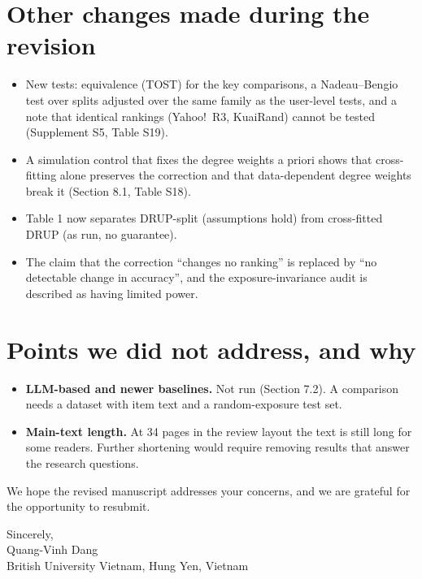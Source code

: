\documentclass[11pt]{article}
\begin{document}
\section*{Other changes made during the revision}
\begin{itemize}[leftmargin=*]
\item New tests: equivalence (TOST) for the key comparisons, a Nadeau--Bengio test over splits adjusted over the same family as the user-level tests, and a note that identical rankings (Yahoo!\ R3, KuaiRand) cannot be tested (Supplement S5, Table S19).
\item A simulation control that fixes the degree weights a priori shows that cross-fitting alone preserves the correction and that data-dependent degree weights break it (Section 8.1, Table S18).
\item Table 1 now separates DRUP-split (assumptions hold) from cross-fitted DRUP (as run, no guarantee).
\item The claim that the correction ``changes no ranking'' is replaced by ``no detectable change in accuracy'', and the exposure-invariance audit is described as having limited power.
\end{itemize}

\section*{Points we did not address, and why}
\begin{itemize}[leftmargin=*]
\item \textbf{LLM-based and newer baselines.} Not run (Section 7.2). A comparison needs a dataset with item text and a random-exposure test set.
\item \textbf{Main-text length.} At 34 pages in the review layout the text is still long for some readers. Further shortening would require removing results that answer the research questions.
\end{itemize}

We hope the revised manuscript addresses your concerns, and we are grateful for the opportunity to resubmit.

Sincerely,\\
Quang-Vinh Dang\\
British University Vietnam, Hung Yen, Vietnam
\end{document}
